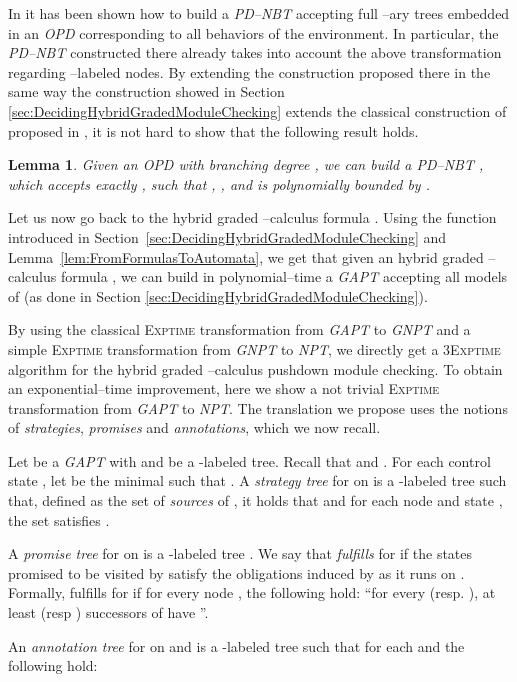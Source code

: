 \documentclass{LMCS}
\theoremstyle{plain}
\def \EXPTIME       {\textsc{Exptime}\xspace}
\def \GAPT          {\emph{GAPT}\xspace}
\def \GNPT          {\emph{GNPT}\xspace}
\def \NPT           {\emph{NPT}\xspace}
\def \OPD           {\emph{OPD}\xspace}
\def \PDNBT         {\emph{PD--NBT}\xspace}
\def \TGAPT         {\emph{GAPT}\xspace}
\def \THREEEXPTIME  {\textsc{3Exptime}\xspace}
\newtheorem{lemma}{Lemma}
\begin{document}
In \cite{BMP05} it has been shown how to build a \PDNBT accepting
full --ary trees embedded in an \OPD corresponding to all
behaviors of the environment. In particular, the \PDNBT
constructed there already takes into account the above
transformation regarding --labeled nodes. By extending
the construction proposed there in the same way the construction
showed in Section \ref{sec:DecidingHybridGradedModuleChecking}
extends the classical construction of  proposed in
\cite{KVW01}, it is not hard to show that the following result
holds.

\begin{lemma}\label{lem:FromOpdToAutomata}
Given an \OPD  with branching degree , we can build a \PDNBT
, which accepts exactly , such
that , , and  is polynomially
bounded by .
\end{lemma}

Let us now go back to the hybrid graded --calculus formula
. Using the function  introduced in
Section~\ref{sec:DecidingHybridGradedModuleChecking} and
Lemma~\ref{lem:FromFormulasToAutomata}, we get that given an
hybrid graded --calculus formula , we can build in
polynomial--time a \GAPT  accepting
all models of  (as done
in Section \ref{sec:DecidingHybridGradedModuleChecking}).

By using the classical \EXPTIME transformation from \GAPT to \GNPT
\cite{KSV02} and a simple \EXPTIME transformation from \GNPT to
\NPT, we directly get a \THREEEXPTIME algorithm for the hybrid
graded --calculus pushdown module checking. To obtain an
exponential--time improvement, here we show a not trivial \EXPTIME
transformation from \TGAPT to \NPT.
The translation we propose uses the notions of \emph{strategies},
\emph{promises} and \emph{annotations}, which we now recall.

Let  be a \TGAPT with
 and  be a
-labeled tree. Recall that  and . For each control state , let  be the minimal  such that . A
\emph{strategy tree} for  on  is a -labeled tree  such that, defined
 as the set of
\emph{sources} of , it holds that   and  for each node  and state , the set 
satisfies .

A \emph{promise tree} for  on  is a -labeled tree . We say that 
\emph{fulfills}  for  if the states promised to be
visited by  satisfy the obligations induced by  as
it runs on . Formally,  fulfills  for  if for
every node , the following hold: ``for every  (resp. ),
at least  (resp ) successors  of 
have ''.

An \emph{annotation tree} for  on  and  is
a -labeled tree  such
that for each  and  the following hold:
\end{document}
